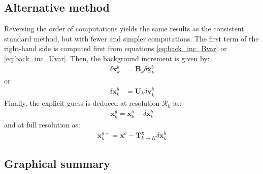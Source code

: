 \documentclass[12pt]{scrartcl}
\begin{document}
\subsection{Alternative method}
Reversing the order of computations yields the same results as the consistent standard method, but with fewer and simpler computations. The first term of the right-hand side is computed first from equations \eqref{eq:back_inc_Bvar} or \eqref{eq:back_inc_Uvar}. Then, the background increment is given by:
\begin{align}
\delta \mathbf{x}^b_k & = \mathbf{B}_k \delta \underline{\overline{\mathbf{x}}}^b_k
\end{align}
or
\begin{align}
\delta \mathbf{x}^b_k & = \mathbf{U}_k \delta \underline{\mathbf{v}}^b_k
\end{align}
Finally, the explicit guess is deduced at resolution $\mathcal{R}_k$ as:
\begin{align}
\mathbf{x}^g_k = \mathbf{x}^b_k - \delta \mathbf{x}^b_k
\end{align}
and at full resolution as:
\begin{align}
\mathbf{x}^{g+}_k = \mathbf{x}^b - \mathbf{T}^\mathbf{x}_{k \rightarrow K} \delta \mathbf{x}^b_k
\end{align}

\subsection{Graphical summary}
\end{document}
